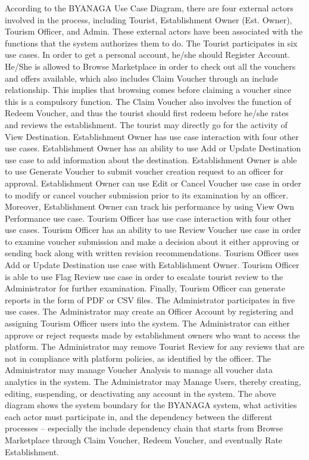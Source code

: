 \documentclass{research}
\begin{document}
According to the BYANAGA Use Case Diagram, there are four external actors involved in the process, including Tourist, Establishment Owner (Est. Owner), Tourism Officer, and Admin. These external actors have been associated with the functions that the system authorizes them to do.
The Tourist participates in six use cases. In order to get a personal account, he/she should Register Account. He/She is allowed to Browse Marketplace in order to check out all the vouchers and offers available, which also includes Claim Voucher through an include relationship. This implies that browsing comes before claiming a voucher since this is a compulsory function. The Claim Voucher also involves the function of Redeem Voucher, and thus the tourist should first redeem before he/she rates and reviews the establishment. The tourist may directly go for the activity of View Destination.
Establishment Owner has use case interaction with four other use cases. Establishment Owner has an ability to use Add or Update Destination use case to add information about the destination. Establishment Owner is able to use Generate Voucher to submit voucher creation request to an officer for approval. Establishment Owner can use Edit or Cancel Voucher use case in order to modify or cancel voucher submission prior to its examination by an officer. Moreover, Establishment Owner can track his performance by using View Own Performance use case.
Tourism Officer has use case interaction with four other use cases. Tourism Officer has an ability to use Review Voucher use case in order to examine voucher submission and make a decision about it either approving or sending back along with written revision recommendations. Tourism Officer uses Add or Update Destination use case with Establishment Owner. Tourism Officer is able to use Flag Review use case in order to escalate tourist review to the Administrator for further examination. Finally, Tourism Officer can generate reports in the form of PDF or CSV files.
The Administrator participates in five use cases. The Administrator may create an Officer Account by registering and assigning Tourism Officer users into the system. The Administrator can either approve or reject requests made by establishment owners who want to access the platform. The Administrator may remove Tourist Review for any reviews that are not in compliance with platform policies, as identified by the officer. The Administrator may manage Voucher Analysis to manage all voucher data analytics in the system. The Administrator may Manage Users, thereby creating, editing, suspending, or deactivating any account in the system.
The above diagram shows the system boundary for the BYANAGA system, what activities each actor must participate in, and the dependency between the different processes – especially the include dependency chain that starts from Browse Marketplace through Claim Voucher, Redeem Voucher, and eventually Rate Establishment.
\end{document}
